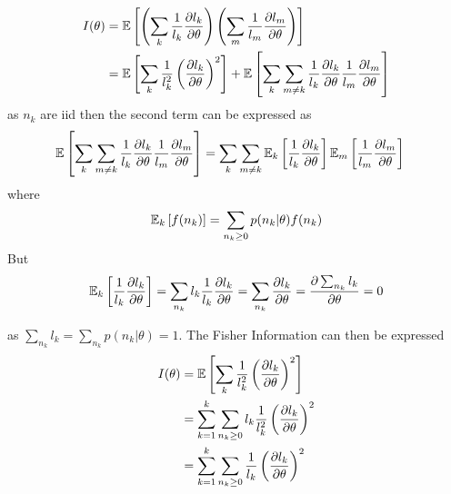 \begin{alignat*}{2}
	I(\theta) 
	& =\mathbb{E}\left[\left(\sum_k\frac{1}{l_k}\frac{\partial l_k}{\partial\theta}\right)\left(\sum_{m}\frac{1}{l_{m}}\frac{\partial l_{m}}{\partial\theta}\right)\right]\\
	& =\mathbb{E}\left[\sum_k\frac{1}{l_k^2}\left(\frac{\partial l_k}{\partial\theta}\right)^2\right]+\mathbb{E}\left[\sum_k\sum_{m\neq k}\frac{1}{l_k}\frac{\partial l_k}{\partial\theta}\frac{1}{l_{m}}\frac{\partial l_{m}}{\partial\theta}\right]
\end{alignat*}
%
as $n_k$ are iid then the second term can be expressed as 
%
\begin{align*}
	\mathbb{E}\left[\sum_k\sum_{m\neq k}\frac{1}{l_k}\frac{\partial l_k}{\partial\theta}\frac{1}{l_{m}}\frac{\partial l_{m}}{\partial\theta}\right] 
	& =\sum_k\sum_{m\neq k}\mathbb{E}_k\left[\frac{1}{l_k}\frac{\partial l_k}{\partial\theta}\right]\mathbb{E}_{m}\left[\frac{1}{l_{m}}\frac{\partial l_{m}}{\partial\theta}\right]
\end{align*}
%
where
%
\begin{equation}
	\mathbb{E}_k\left[f(n_k)\right]=\sum_{n_k\geq0}p(n_k|\theta)f(n_k)
\end{equation}
%
But 
\begin{equation}
	\mathbb{E}_k\left[\frac{1}{l_k}\frac{\partial l_k}{\partial\theta}\right]=\sum_{n_k}l_k\frac{1}{l_k}\frac{\partial l_k}{\partial\theta}=\sum_{n_k}\frac{\partial l_k}{\partial\theta}=\frac{\partial\sum_{n_k}l_k}{\partial\theta}=0
\end{equation}

as $\sum_{n_k}l_k=\sum_{n_k}p(n_k|\theta)=1$. The Fisher Information can then be expressed 
%
\begin{align*}
	I(\theta) & =\mathbb{E}\left[\sum_k\frac{1}{l_k^2}\left(\frac{\partial l_k}{\partial\theta}\right)^2\right]\\
	& =\sum_{k=1}^k\sum_{n_k\geq0}l_k\frac{1}{l_k^2}\left(\frac{\partial l_k}{\partial\theta}\right)^2\\
	& =\sum_{k=1}^k\sum_{n_k\geq0}\frac{1}{l_k}\left(\frac{\partial l_k}{\partial\theta}\right)^2
\end{align*}


